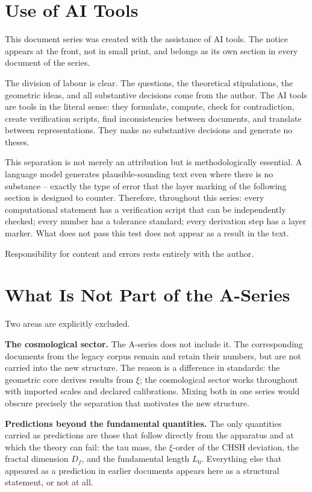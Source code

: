 \section{Use of AI Tools}

This document series was created with the assistance of AI tools. The
notice appears at the front, not in small print, and belongs as its own
section in every document of the series.

The division of labour is clear. The questions, the theoretical stipulations,
the geometric ideas, and all substantive decisions come from the author. The
AI tools are tools in the literal sense: they formulate, compute, check for
contradiction, create verification scripts, find inconsistencies between
documents, and translate between representations. They make no substantive
decisions and generate no theses.

This separation is not merely an attribution but is methodologically
essential. A language model generates plausible-sounding text even where
there is no substance -- exactly the type of error that the layer marking
of the following section is designed to counter. Therefore, throughout this
series: every computational statement has a verification script that can be
independently checked; every number has a tolerance standard; every
derivation step has a layer marker. What does not pass this test does not
appear as a result in the text.

Responsibility for content and errors rests entirely with the author.


\section{What Is Not Part of the A-Series}

Two areas are explicitly excluded.

\textbf{The cosmological sector.} The A-series does not include it. The
corresponding documents from the legacy corpus remain and retain their numbers,
but are not carried into the new structure. The reason is a difference in
standards: the geometric core derives results from $\xi$; the cosmological
sector works throughout with imported scales and declared calibrations. Mixing
both in one series would obscure precisely the separation that motivates the
new structure.

\textbf{Predictions beyond the fundamental quantities.} The only quantities
carried as predictions are those that follow directly from the apparatus and
at which the theory can fail: the tau mass, the $\xi$-order of the CHSH
deviation, the fractal dimension $D_f$, and the fundamental length $L_0$.
Everything else that appeared as a prediction in earlier documents appears
here as a structural statement, or not at all.

